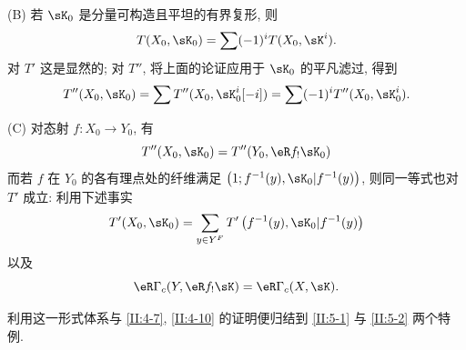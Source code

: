 (B) 若 $\sK_0$ 是分量可构造且平坦的有界复形, 则
\[
  T(X_0,\sK_0) = \sum (-1)^i T(X_0,\sK^i) \text{.}
\]
对 $T'$ 这是显然的; 对 $T''$, 将上面的论证应用于 $\sK_0$ 的平凡滤过, 得到
\[
  T''(X_0,\sK_0) = \sum T''(X_0,\sK_0^i[-i]) = \sum (-1)^i T''(X_0,\sK_0^i) \text{.}
\]

(C) 对态射 $f:X_0\to Y_0$, 有
\[
  T''(X_0,\sK_0) = T''(Y_0,\eR f_! \sK_0)
\]
而若 $f$ 在 $Y_0$ 的各有理点处的纤维满足 $\left(1;f^{-1}(y),\sK_0|f^{-1}(y)\right)$, 则同一等式也对 $T'$ 成立: 利用下述事实
\[
  T'(X_0,\sK_0) = \sum_{y\in Y^F} T'\left(f^{-1}(y), \sK_0|f^{-1}(y)\right)
\]
以及
\[
  \eR\Gamma_c(Y, \eR f_! \sK) = \eR\Gamma_c(X,\sK) \text{.}
\]

利用这一形式体系与 \ref{II:4-7}, \ref{II:4-10} 的证明便归结到 \ref{II:5-1} 与 \ref{II:5-2} 两个特例.
